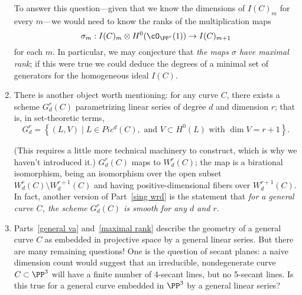 \begin{enumerate}
To answer this question---given that we know the dimensions of $I(C)_m$ for every $m$---we would need to know the ranks of the multiplication maps
$$
\sigma_m : I(C)_m \otimes H^0(\cO_{\PP^r}(1)) \to I(C)_{m+1}
$$
for each $m$. In particular, we may conjecture that \emph{the maps $\sigma$ have maximal rank}; if this were true we could deduce the degrees of a minimal set of generators for the homogeneous ideal $I(C)$.

\item There is another object worth mentioning: for any curve $C$, there exists a scheme $G^r_d(C)$ parametrizing linear series of degree $d$ and dimension $r$; that is, in set-theoretic terms,
$$
G^r_d = \left\{ (L, V) \mid L \in Pic^d(C), \text{ and } V \subset H^0(L) \text{ with } \dim V = r+1 \right\}.
$$

(This requires a little more technical machinery to construct, which is why we haven't introduced it.) $G^r_d(C)$ maps to $W^r_d(C)$; the map is a birational isomorphism, being an isomorphism over the open subset $W^r_d(C) \setminus W^{r+1}_d(C)$ and having positive-dimensional fibers over $W^{r+1}_d(C)$. In fact, another version of Part~\ref{sing wrd} is the statement that \emph{for a general curve $C$, the scheme $G^r_d(C)$ is smooth for any $d$ and $r$}.

\item Parts~\ref{general va} and~\ref{maximal rank} describe the geometry of a general curve $C$ as embedded in projective space by a general linear series. But there are many remaining questions! One is the question of secant planes: a naive dimension count would suggest that an irreducible, nondegenerate curve $C \subset \PP^3$ will have a finite number of 4-secant lines, but no 5-secant lines. Is this true for a general curve embedded in $\PP^3$ by a general linear series?
\end{enumerate}

